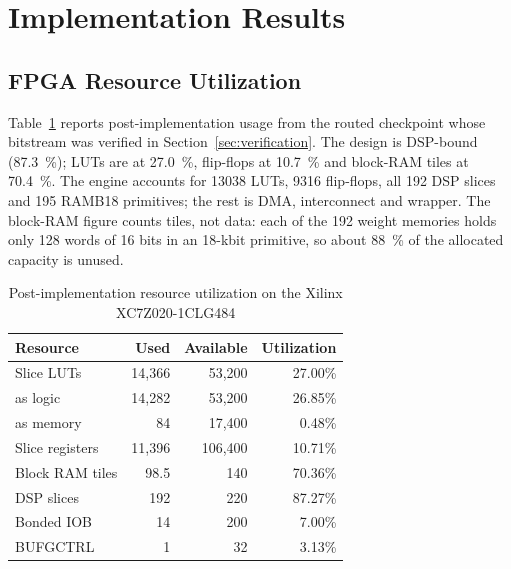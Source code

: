 \documentclass[final,5p,times,twocolumn]{elsarticle}
\begin{document}
\section{Implementation Results}
\label{sec:implresults}
\subsection{FPGA Resource Utilization}
\label{sec:resources}
Table~\ref{tab:resource_utilization} reports post-implementation usage from the
routed checkpoint whose bitstream was verified in
Section~\ref{sec:verification}. The design is DSP-bound (\SI{87.3}{\percent});
LUTs are at \SI{27.0}{\percent}, flip-flops at \SI{10.7}{\percent} and block-RAM
tiles at \SI{70.4}{\percent}. The engine accounts for \num{13038} LUTs,
\num{9316} flip-flops, all 192 DSP slices and 195 RAMB18 primitives; the rest is
DMA, interconnect and wrapper. The block-RAM figure counts tiles, not data: each
of the 192 weight memories holds only 128 words of 16 bits in an 18-kbit
primitive, so about \SI{88}{\percent} of the allocated capacity is unused.

\begin{table}[htbp]
\centering
\caption{Post-implementation resource utilization on the Xilinx XC7Z020-1CLG484}
\label{tab:resource_utilization}
\begin{tabular}{lrrr}
\toprule
Resource & Used & Available & Utilization \\
\midrule
Slice LUTs        & 14{,}366 & 53{,}200  & 27.00\% \\
\quad as logic    & 14{,}282 & 53{,}200  & 26.85\% \\
\quad as memory   &       84 & 17{,}400  &  0.48\% \\
Slice registers   & 11{,}396 & 106{,}400 & 10.71\% \\
Block RAM tiles   &     98.5 & 140       & 70.36\% \\
DSP slices        &      192 & 220       & 87.27\% \\
Bonded IOB        &       14 & 200       &  7.00\% \\
BUFGCTRL          &        1 & 32        &  3.13\% \\
\bottomrule
\end{tabular}
\end{table}
\end{document}
